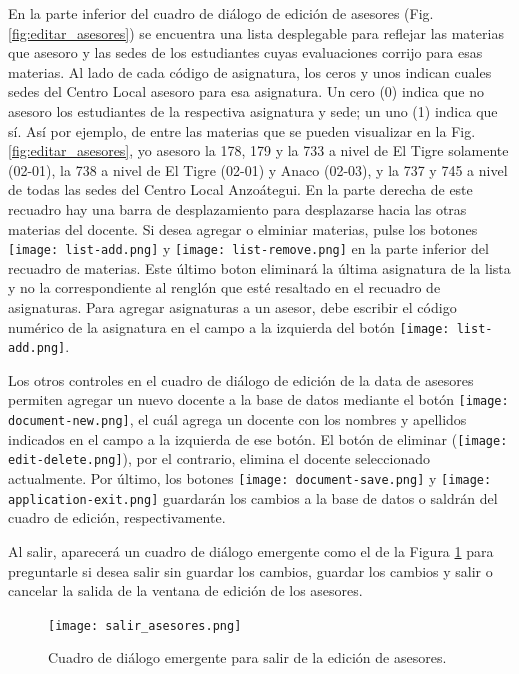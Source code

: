\documentclass[letterpaper,12pt]{book}
\begin{document}
En la parte inferior del cuadro de diálogo de edición de asesores (Fig. \ref{fig:editar_asesores}) se encuentra una lista desplegable para reflejar las materias que asesoro y las sedes de los estudiantes cuyas evaluaciones corrijo para esas materias. Al lado de cada código de asignatura, los ceros y unos indican cuales sedes del Centro Local asesoro para esa asignatura. Un cero (0) indica que no asesoro los estudiantes de la respectiva asignatura y sede; un uno (1) indica que sí. Así por ejemplo, de entre las materias que se pueden visualizar en la Fig. \ref{fig:editar_asesores}, yo asesoro la 178, 179 y la 733 a nivel de El Tigre solamente (02-01), la 738 a nivel de El Tigre (02-01) y Anaco (02-03), y la 737 y  745 a nivel de todas las sedes del Centro Local Anzoátegui. En la parte derecha de este recuadro hay una barra de desplazamiento para desplazarse hacia las otras materias del docente.  Si desea agregar o elminiar materias, pulse los botones \texttt{[image: list-add.png]} y \texttt{[image: list-remove.png]} en la parte inferior del recuadro de materias. Este último boton eliminará la última asignatura de la lista y no la correspondiente al renglón que esté resaltado en el recuadro de asignaturas. Para agregar asignaturas a un asesor, debe escribir el código numérico de la asignatura en el campo a la izquierda del botón \texttt{[image: list-add.png]}. 

Los otros controles en el cuadro de diálogo de edición de la data de asesores permiten agregar un nuevo docente a la base de datos mediante el botón \texttt{[image: document-new.png]}, el cuál agrega un docente con los nombres y apellidos indicados en el campo a la izquierda de ese botón. El botón de eliminar (\texttt{[image: edit-delete.png]}), por el contrario, elimina el docente seleccionado actualmente. Por último, los botones \texttt{[image: document-save.png]} y \texttt{[image: application-exit.png]} guardarán los cambios a la base de datos o saldrán del cuadro de edición, respectivamente.

Al salir, aparecerá un cuadro de diálogo emergente como el de la Figura \ref{fig:salir_asesores} para preguntarle si desea salir sin guardar los cambios, guardar los cambios y salir o cancelar la salida de la ventana de edición de los asesores.

\begin{figure}[!ht]
  \centering
  \texttt{[image: salir\_asesores.png]}
  \caption{Cuadro de diálogo emergente para salir de la edición de asesores.}
  \label{fig:salir_asesores}
\end{figure}
\end{document}
